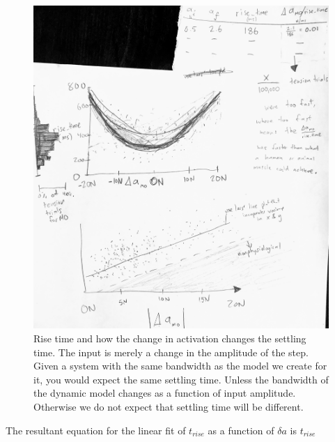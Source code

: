 \documentclass[utf8]{frontiersSCNS} %
\begin{document}
\begin{figure}[h!]
\begin{center}
\includegraphics[width=17.5cm]{figures/rise_time_and_delta_activation/rise_time_and_delta_activation.jpg}%
\end{center}
\caption{Rise time and how the change in activation changes the settling time. The input is merely a change in the amplitude of the step. Given a system with the same bandwidth as the model we create for it, you would expect the same settling time. Unless the bandwidth of the dynamic model changes as a function of input amplitude. Otherwise we do not expect that settling time will be different. }
\label{fig:rise_time_and_delta_activation}
\end{figure}

The resultant equation for the linear fit of $t_{rise}$ as a function of $\delta a$ is $t_{rise}$
\end{document}
